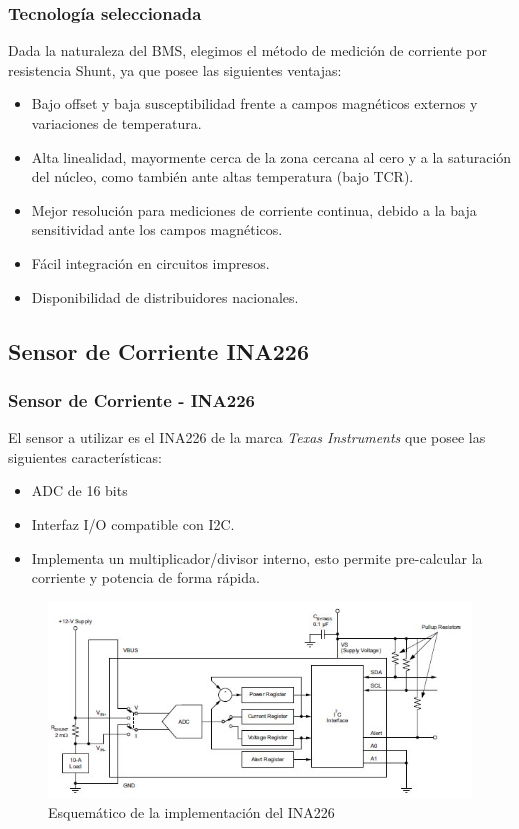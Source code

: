 \documentclass[10pt]{beamer}
\theoremstyle{remark}
\theoremstyle{definition}
\begin{document}
\begin{frame}[allowframebreaks]
  \frametitle{Tecnología seleccionada}
  Dada la naturaleza del BMS, elegimos el método de medición de corriente por
  resistencia Shunt, ya que posee las siguientes ventajas:

  \begin{itemize}
	\item Bajo offset y baja susceptibilidad frente a campos magnéticos externos
	  y variaciones de temperatura.
	\item Alta linealidad, mayormente cerca de la zona cercana al cero y a la
	  saturación del núcleo, como también ante altas temperatura (bajo TCR).
	\item Mejor resolución para mediciones de corriente continua, debido a la
	  baja sensitividad ante los campos magnéticos.
	\item Fácil integración en circuitos impresos.
	\item Disponibilidad de distribuidores nacionales.
  \end{itemize}

\end{frame}

\subsection{Sensor de Corriente INA226}

\begin{frame}[allowframebreaks]
  \frametitle{Sensor de Corriente - INA226}
  El sensor a utilizar es el INA226 de la marca \emph{Texas Instruments} que
  posee las siguientes características:
  \begin{itemize}
	\item ADC de 16 bits
	\item Interfaz I/O compatible con I2C.
	\item Implementa un multiplicador/divisor interno, esto permite pre-calcular
	  la corriente y potencia de forma rápida.
  \end{itemize}

  \framebreak

  \begin{figure}[h!]
	\includegraphics[width=1\textwidth]{./images/INA226-Common_Implementation.jpg}
	\caption{Esquemático de la implementación del INA226}
	\label{sch_ina226}
  \end{figure}

\end{frame}
\end{document}
